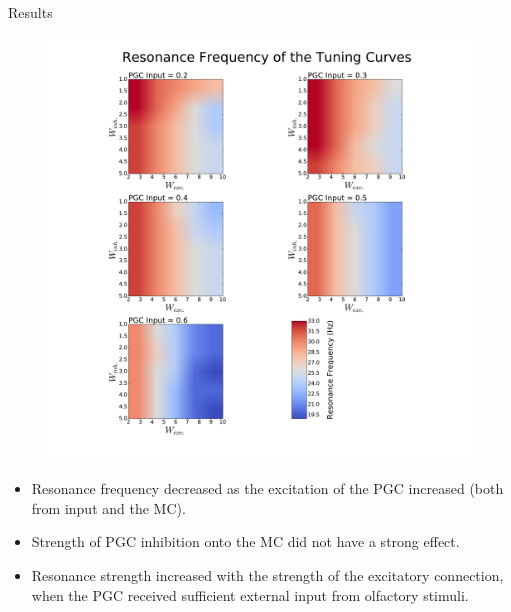 \documentclass[final,hyperref={pdfpagelabels=false}]{beamer}
\begin{document}
\begin{frame}{}
\begin{columns}[t]
\begin{column}{.48\linewidth}
\begin{block}{Results}
\begin{figure}
\center
\includegraphics[scale=0.5]{images/Contour_plot_tuning_frequency}
\end{figure} 
\begin{itemize}
\item Resonance frequency decreased as the excitation of the PGC increased (both from input and the MC).
\item Strength of PGC inhibition onto the MC did not have a strong effect.
\item Resonance strength increased with the strength of the excitatory connection, when the PGC received sufficient external input from olfactory stimuli.
\end{itemize}
\end{block}


\end{column}
\end{columns}
\end{frame}
\end{document}
